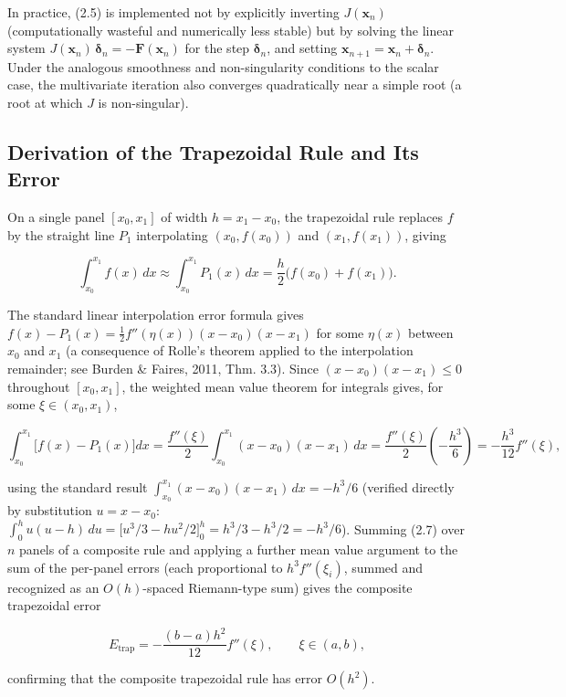 \documentclass[
]{article}
\begin{document}
In practice, (2.5) is implemented not by explicitly inverting
\(J(\mathbf x_n)\) (computationally wasteful and numerically less
stable) but by solving the linear system
\(J(\mathbf x_n)\,\boldsymbol\delta_n = -\mathbf F(\mathbf x_n)\) for
the step \(\boldsymbol\delta_n\), and setting
\(\mathbf x_{n+1} = \mathbf x_n + \boldsymbol\delta_n\). Under the
analogous smoothness and non-singularity conditions to the scalar case,
the multivariate iteration also converges quadratically near a simple
root (a root at which \(J\) is non-singular).

\subsection{Derivation of the Trapezoidal Rule and Its
Error}\label{derivation-of-the-trapezoidal-rule-and-its-error}

On a single panel \([x_0,x_1]\) of width \(h=x_1-x_0\), the trapezoidal
rule replaces \(f\) by the straight line \(P_1\) interpolating
\((x_0,f(x_0))\) and \((x_1,f(x_1))\), giving

\[
\int_{x_0}^{x_1} f(x)\,dx \approx \int_{x_0}^{x_1} P_1(x)\,dx
= \frac{h}{2}\bigl(f(x_0)+f(x_1)\bigr).
\tag{2.6}
\]

The standard linear interpolation error formula gives
\(f(x)-P_1(x) = \tfrac12 f''(\eta(x))(x-x_0)(x-x_1)\) for some
\(\eta(x)\) between \(x_0\) and \(x_1\) (a consequence of Rolle's
theorem applied to the interpolation remainder; see Burden \& Faires,
2011, Thm. 3.3). Since \((x-x_0)(x-x_1)\le 0\) throughout \([x_0,x_1]\),
the weighted mean value theorem for integrals gives, for some
\(\xi\in(x_0,x_1)\),

\[
\int_{x_0}^{x_1} \bigl[f(x)-P_1(x)\bigr]dx
= \frac{f''(\xi)}{2}\int_{x_0}^{x_1}(x-x_0)(x-x_1)\,dx
= \frac{f''(\xi)}{2}\left(-\frac{h^3}{6}\right) = -\frac{h^3}{12}f''(\xi),
\tag{2.7}
\]

using the standard result
\(\int_{x_0}^{x_1}(x-x_0)(x-x_1)\,dx = -h^3/6\) (verified directly by
substitution \(u=x-x_0\):
\(\int_0^h u(u-h)\,du = \bigl[u^3/3-hu^2/2\bigr]_0^h
= h^3/3-h^3/2=-h^3/6\)). Summing (2.7) over \(n\) panels of a composite
rule and applying a further mean value argument to the sum of the
per-panel errors (each proportional to \(h^3f''(\xi_i)\), summed and
recognized as an \(O(h)\)-spaced Riemann-type sum) gives the composite
trapezoidal error

\[
E_{\text{trap}} = -\frac{(b-a)h^2}{12} f''(\xi), \qquad \xi\in(a,b),
\tag{2.8}
\]

confirming that the composite trapezoidal rule has error \(O(h^2)\).
\end{document}
